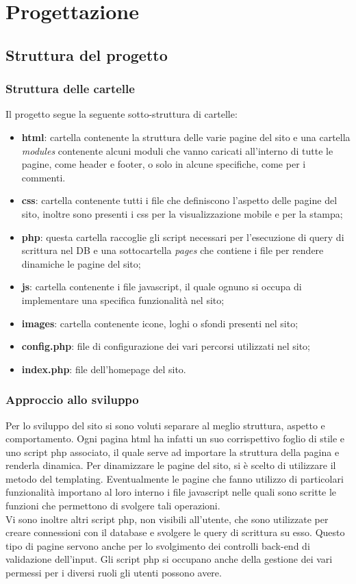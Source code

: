 \section{Progettazione}
\label{sec:progettazione}
\subsection{Struttura del progetto}
\subsubsection{Struttura delle cartelle}
Il progetto segue la seguente sotto-struttura di cartelle:
\begin{itemize}
	\item \textbf{html}: cartella contenente la struttura delle varie pagine del sito e una cartella \textit{modules} contenente alcuni moduli che vanno caricati all'interno di tutte le pagine, come header e footer, o solo in alcune specifiche, come per i commenti.
	\item \textbf{css}: cartella contenente tutti i file che definiscono l'aspetto delle pagine del sito, inoltre sono presenti i css per la visualizzazione mobile e per la stampa;
	\item \textbf{php}: questa cartella raccoglie gli script necessari per l'esecuzione di query di scrittura nel DB e una sottocartella \textit{pages} che contiene i file per rendere dinamiche le pagine del sito;
	\item \textbf{js}: cartella contenente i file javascript, il quale ognuno si occupa di implementare una specifica funzionalità nel sito;
	\item \textbf{images}: cartella contenente icone, loghi o sfondi presenti nel sito; 
	\item \textbf{config.php}: file di configurazione dei vari percorsi utilizzati nel sito;
	\item \textbf{index.php}: file dell'homepage del sito.
\end{itemize}
\subsubsection{Approccio allo sviluppo}
Per lo sviluppo del sito si sono voluti separare al meglio struttura, aspetto e comportamento. Ogni pagina html ha infatti un suo corrispettivo foglio di stile e uno script php associato, il quale serve ad importare la struttura della pagina e renderla dinamica. Per dinamizzare le pagine del sito, si è scelto di utilizzare il metodo del templating. Eventualmente le pagine che fanno utilizzo di particolari funzionalità importano al loro interno i file javascript nelle quali sono scritte le funzioni che permettono di svolgere tali operazioni.\\
Vi sono inoltre altri script php, non visibili all'utente, che sono utilizzate per creare connessioni con il database e svolgere le query di scrittura su esso. Questo tipo di pagine servono anche per lo svolgimento dei controlli back-end di validazione dell'input. Gli script php si occupano anche della gestione dei vari permessi per i diversi ruoli gli utenti possono avere.

